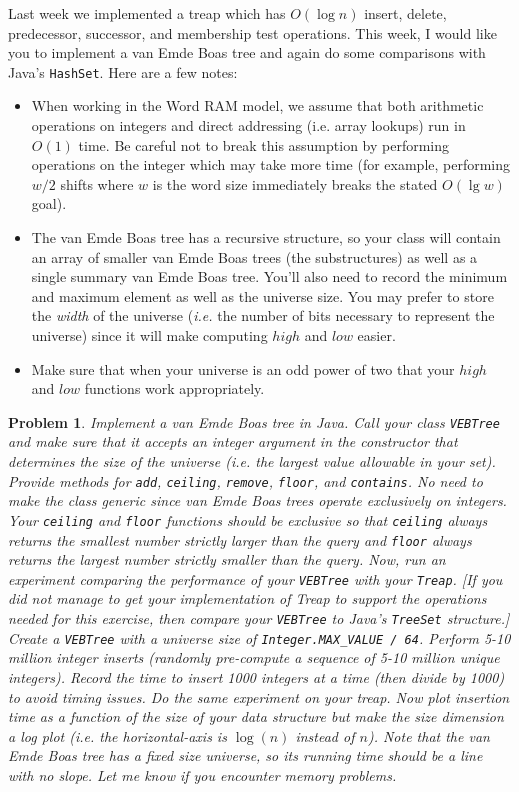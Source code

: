 \documentclass[11pt]{article}
\newtheorem{problem}{Problem}
\begin{document}
Last week we implemented a treap which has $O(\log n)$ insert, delete, predecessor, successor, and membership test operations.  This week, I would like you to implement a van Emde Boas tree and again do some comparisons with Java's {\tt HashSet}.  Here are a few notes:
\begin{itemize}

	\item When working in the Word RAM model, we assume that both arithmetic operations on integers and direct addressing (i.e. array lookups) run in $O(1)$ time.  Be careful not to break this assumption by performing operations on the integer which may take more time (for example, performing $w/2$ shifts where $w$ is the word size immediately breaks the stated $O(\lg w)$ goal).
	\item The van Emde Boas tree has a recursive structure, so your class will contain an array of smaller van Emde Boas trees (the substructures) as well as a single summary van Emde Boas tree.  You'll also need to record the minimum and maximum element as well as the universe size.  You may prefer to store the {\em width} of the universe ({\em i.e.} the number of bits necessary to represent the universe) since it will make computing $high$ and $low$ easier.
	\item Make sure that when your universe is an odd power of two that your $high$ and $low$ functions work appropriately.
	
\end{itemize}


\begin{problem}
Implement a van Emde Boas tree in Java.  Call your class {\tt VEBTree} and make sure that it accepts an integer argument in the constructor that determines the size of the universe (i.e. the largest value allowable in your set).  Provide methods for {\tt add}, {\tt ceiling}, {\tt remove}, {\tt floor}, and {\tt contains}.  No need to make the class generic since van Emde Boas trees operate exclusively on integers.  Your {\tt ceiling} and {\tt floor} functions should be exclusive so that {\tt ceiling} always returns the smallest number strictly larger than the query and {\tt floor} always returns the largest number strictly smaller than the query.  Now, run an experiment comparing the performance of your {\tt VEBTree} with your {\tt Treap}. [If you did not manage to get your implementation of Treap to support the operations needed for this exercise, then compare your {\tt VEBTree} to Java's {\tt TreeSet} structure.]  Create a {\tt VEBTree} with a universe size of {\tt Integer.MAX\_VALUE / 64}.  Perform 5-10 million integer inserts (randomly pre-compute a sequence of 5-10 million unique integers).  Record the time to insert 1000 integers at a time (then divide by 1000) to avoid timing issues.  Do the same experiment on your treap.  Now plot insertion time as a function of the size of your data structure but make the size dimension a log plot (i.e. the horizontal-axis is $\log(n)$ instead of $n$).  Note that the van Emde Boas tree has a fixed size universe, so its running time should be a line with no slope.  Let me know if you encounter memory problems. 
\end{problem}
\end{document}
